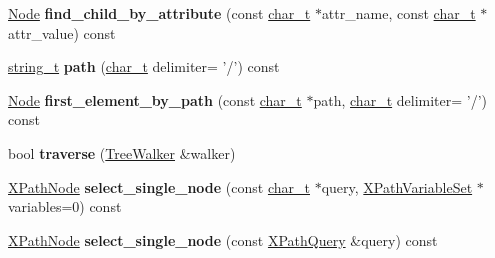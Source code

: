 \begin{DoxyCompactItemize}
\item 
\hypertarget{classphys_1_1xml_1_1Node_aa3ea620c51e0af54aebcf78586086a9a}{
\hyperlink{classphys_1_1xml_1_1Node}{Node} {\bfseries find\_\-child\_\-by\_\-attribute} (const \hyperlink{namespacephys_1_1xml_afc87705cd1c2917d87b879715a2d8f6e}{char\_\-t} $\ast$attr\_\-name, const \hyperlink{namespacephys_1_1xml_afc87705cd1c2917d87b879715a2d8f6e}{char\_\-t} $\ast$attr\_\-value) const }
\label{d7/d0a/classphys_1_1xml_1_1Node_aa3ea620c51e0af54aebcf78586086a9a}

\item 
\hypertarget{classphys_1_1xml_1_1Node_a74b9f51a6642808510e71f643cc861ad}{
\hyperlink{namespacephys_1_1xml_a6db751f2b35502e04c123bb70daa0d20}{string\_\-t} {\bfseries path} (\hyperlink{namespacephys_1_1xml_afc87705cd1c2917d87b879715a2d8f6e}{char\_\-t} delimiter= '/') const }
\label{d7/d0a/classphys_1_1xml_1_1Node_a74b9f51a6642808510e71f643cc861ad}

\item 
\hypertarget{classphys_1_1xml_1_1Node_ad771e6d5faca7c608a6a6cd1e29dd3d8}{
\hyperlink{classphys_1_1xml_1_1Node}{Node} {\bfseries first\_\-element\_\-by\_\-path} (const \hyperlink{namespacephys_1_1xml_afc87705cd1c2917d87b879715a2d8f6e}{char\_\-t} $\ast$path, \hyperlink{namespacephys_1_1xml_afc87705cd1c2917d87b879715a2d8f6e}{char\_\-t} delimiter= '/') const }
\label{d7/d0a/classphys_1_1xml_1_1Node_ad771e6d5faca7c608a6a6cd1e29dd3d8}

\item 
\hypertarget{classphys_1_1xml_1_1Node_abf6c5b96ced5404a204a4700f044f982}{
bool {\bfseries traverse} (\hyperlink{classphys_1_1xml_1_1TreeWalker}{TreeWalker} \&walker)}
\label{d7/d0a/classphys_1_1xml_1_1Node_abf6c5b96ced5404a204a4700f044f982}

\item 
\hypertarget{classphys_1_1xml_1_1Node_ad3caa2f4cafd56c79000a5af848f3e62}{
\hyperlink{classphys_1_1xml_1_1XPathNode}{XPathNode} {\bfseries select\_\-single\_\-node} (const \hyperlink{namespacephys_1_1xml_afc87705cd1c2917d87b879715a2d8f6e}{char\_\-t} $\ast$query, \hyperlink{classphys_1_1xml_1_1XPathVariableSet}{XPathVariableSet} $\ast$variables=0) const }
\label{d7/d0a/classphys_1_1xml_1_1Node_ad3caa2f4cafd56c79000a5af848f3e62}

\item 
\hypertarget{classphys_1_1xml_1_1Node_a599ed26773b23999c6f2e87e76deb0fd}{
\hyperlink{classphys_1_1xml_1_1XPathNode}{XPathNode} {\bfseries select\_\-single\_\-node} (const \hyperlink{classphys_1_1xml_1_1XPathQuery}{XPathQuery} \&query) const }
\label{d7/d0a/classphys_1_1xml_1_1Node_a599ed26773b23999c6f2e87e76deb0fd}


\end{DoxyCompactItemize}
